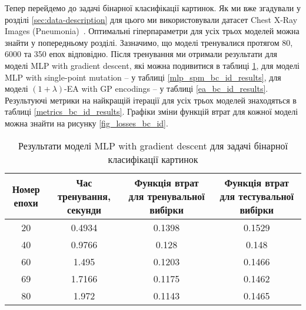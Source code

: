 Тепер перейдемо до задачі бінарної класифікації картинок. Як ми вже згадували у розділі \ref{sec:data-description} для цього ми використовували датасет Chest X-Ray Images (Pneumonia)~\cite{ct32}. Оптимальні гіперпараметри для усіх трьох моделей можна знайти у попередньому розділі. Зазначимо, що моделі тренувалися протягом 80, 6000 та 350 епох відповідно. Після тренування ми отримали результати для моделі MLP with gradient descent, які можна подивитися в таблиці \ref{mlp_gd_bc_id_results}, для моделі MLP with single-point mutation -- у таблиці \ref{mlp_spm_bc_id_results}, для моделі $(1+\lambda)$-EA with GP encodings -- у таблиці \ref{ea_bc_id_results}. Результуючі метрики на найкращій ітерації для усіх трьох моделей знаходяться в таблиці \ref{metrics_bc_id_results}. Графіки зміни функцій втрат для кожної моделі можна знайти на рисунку \ref{fig_losses_bc_id}.

\begin{table}[ht]
	\centering
	\begin{adjustbox}{max width=\textwidth}
		\begin{tabular}{|c|c|c|c|}
			\hline 
			Номер епохи & Час тренування, секунди & Функція втрат для тренувальної вибірки & Функція втрат для тестувальної вибірки \\
			\hline 
			20 & 0.4934 & 0.1398 & 0.1529 \\
			\hline 
			40 & 0.9766 & 0.128 & 0.148 \\
			\hline
			60 & 1.495 & 0.1203 & 0.1466 \\
			\hline
			69 & 1.7166 & 0.1175 & 0.1462 \\
			\hline
			80 & 1.972 & 0.1143 & 0.1465 \\
			\hline
		\end{tabular}
	\end{adjustbox}
	\caption{Результати моделі MLP with gradient descent для задачі бінарної класифікації картинок}
	\label{mlp_gd_bc_id_results}
\end{table}

